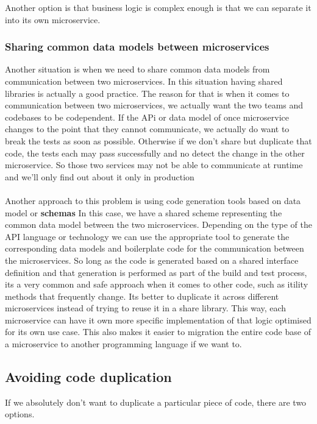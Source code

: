 Another option is that business logic is complex enough is that we can separate it into its own microservice.

\subsubsection{Sharing common data models between microservices}
Another situation is when we need to share common data models from communication between two microservices.
In this situation having shared libraries is actually a good practice.
The reason for that is when it comes to communication between two microservices, we actually want the two teams and codebases to be codependent.
If the APi or data model of once microservice changes to the point that they cannot communicate, we actually do want to break the tests as soon as possible.
Otherwise if we don't share but duplicate that code, the tests each may pass successfully and no detect the change in the other microservice.
So those two services may not be able to communicate at runtime and we'll only find out about it only in production

\paragraph{}
Another approach to this problem is using code generation tools based on data model or \textbf{schemas}
In this case, we have a shared scheme representing the common data model between the two microservices.
Depending on the type of the API language or technology we can use the appropriate tool to generate the corresponding data models and boilerplate code for the communication between the microservices.
So long as the code is generated based on a shared interface definition and that generation is performed as part of the build and test process, its a very common and safe approach when it comes to other code, such as itility methods that frequently change.
Its better to duplicate it across different microservices instead of trying to reuse it in a share library.
This way, each microservice can have it own more specific implementation of that logic optimised for its own use case.
This also makes it easier to migration the entire code base of a microservice to another programming language if we want to.

\subsection{Avoiding code duplication}
If we absolutely don't want to duplicate a particular piece of code, there are two options.

